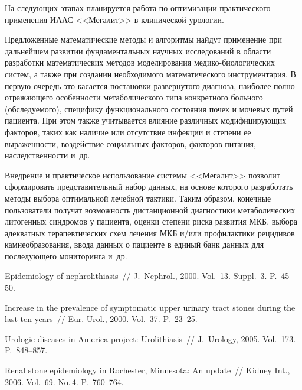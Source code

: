 \begin{multicols}{2}
      На следующих этапах планируется работа по оптимизации практического применения 
ИААС <<Мегалит>> в 
клинической урологии.
      
      Предложенные математические методы и алгоритмы найдут применение при 
дальнейшем развитии фундаментальных научных исследований в области разработки 
математических методов моделирования медико-биологических систем, а также при создании 
необходимого математического инструментария.
      В первую очередь это касается постановки развернутого диагноза, наиболее полно 
отражающего особенности метаболического типа конкретного больного (обследуемого), 
специфику функционального состояния почек и мочевых путей пациента. При этом также 
учитывается влияние различных модифицирующих факторов, таких как наличие или 
отсутствие инфекции и степени ее вы\-ра\-жен\-ности, воздействие социальных факторов, 
факторов питания, наследственности и~др. 
      
      Внедрение и практическое использование сис\-те\-мы <<Мегалит>> позволит 
сформировать представительный набор данных, на основе которого разработать методы 
выбора оптимальной лечебной тактики. Таким образом, конечные пользователи получат 
возможность дистанционной диагностики метаболических литогенных синдромов у пациента, 
оценки степени риска развития МКБ, выбора адекватных терапевтических схем лечения МКБ 
и/или профилактики рецидивов камнеобразования, ввода данных о пациенте в единый банк 
данных для последующего мониторинга и~др. 

{\small\frenchspacing
{%
\begin{thebibliography}{99}

 Epidemiology of nephrolithiasis~// J.~Nephrol., 2000. 
Vol.~13. Suppl.~3. P.~45--50.

 Increase in the 
prevalence of symptomatic upper urinary tract stones during the last ten years~// Eur. Urol., 2000. 
Vol.~37. P.~23--25.

 Urologic diseases in America project: 
Urolithiasis~// J.~Urology, 2005. Vol.~173. P.~848--857. 

 Renal stone epidemiology in Rochester, Minnesota: An update~// Kidney 
Int., 2006. Vol.~69. No.\,4. P.~760--764.



\end{thebibliography}}}
\end{multicols}
